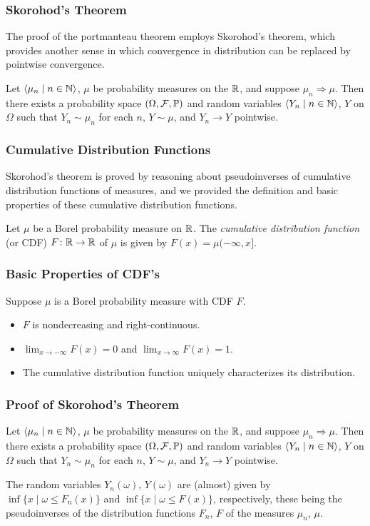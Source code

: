 \documentclass{beamer}
\newcommand\bldseq[2]{\langle{#1}\mid{#2}\rangle}
\newcommand\bldset[2]{\{{#1}\mid{#2}\}}
\begin{document}
\begin{frame}
\frametitle{Skorohod's Theorem}
The proof of the portmanteau theorem employs Skorohod's theorem, which provides another sense in which convergence in distribution can be replaced by pointwise convergence. \pause

\begin{theorem}
Let $\bldseq{\mu_n}{n \in \N}$, $\mu$ be probability measures on the $\R$, and suppose $\mu_n \Rightarrow \mu$. Then there exists a probability space $(\Omega, \mathcal F, \P)$ and random variables $\bldseq{Y_n}{n \in \N}$, $Y$ on $\Omega$ such that $Y_n \sim \mu_n$ for each $n$, $Y \sim \mu$, and $Y_n \rightarrow Y$ pointwise.
\end{theorem}
\end{frame}

\begin{frame}
\frametitle{Cumulative Distribution Functions}
Skorohod's theorem is proved by reasoning about pseudoinverses of cumulative distribution functions of measures, and we provided the definition and basic properties of these cumulative distribution functions. \pause

\begin{definition}
Let $\mu$ be a Borel probability measure on $\R$. The {\em cumulative distribution function} (or CDF) $F\colon \R \rightarrow \R$ of $\mu$ is given by $F(x) = \mu (-\infty,x]$.
\end{definition}
\end{frame}

\begin{frame}
\frametitle{Basic Properties of CDF's}
Suppose $\mu$ is a Borel probability measure with CDF $F$. \pause
\begin{itemize}
\item $F$ is nondecreasing and right-continuous. \pause
\item $\lim_{x \rightarrow -\infty} F(x) = 0$ and $\lim_{x \rightarrow \infty} F(x) = 1$. \pause
\item The cumulative distribution function uniquely characterizes its distribution.
\end{itemize}
\end{frame}

\begin{frame}
\frametitle{Proof of Skorohod's Theorem}
\begin{theorem}
Let $\bldseq{\mu_n}{n \in \N}$, $\mu$ be probability measures on the $\R$, and suppose $\mu_n \Rightarrow \mu$. Then there exists a probability space $(\Omega, \mathcal F, \P)$ and random variables $\bldseq{Y_n}{n \in \N}$, $Y$ on $\Omega$ such that $Y_n \sim \mu_n$ for each $n$, $Y \sim \mu$, and $Y_n \rightarrow Y$ pointwise.
\end{theorem}

\pause

The random variables $Y_n(\omega)$, $Y(\omega)$ are (almost) given by $\inf \bldset{x}{\omega \le F_n(x)}$ and $\inf \bldset{x}{\omega \le F(x)}$, respectively, these being the pseudoinverses of the distribution functions $F_n$, $F$ of the measures $\mu_n$, $\mu$.
\end{frame}
\end{document}
